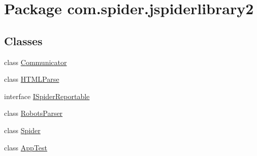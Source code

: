 \hypertarget{namespacecom_1_1spider_1_1jspiderlibrary2}{\section{\-Package com.\-spider.\-jspiderlibrary2}
\label{namespacecom_1_1spider_1_1jspiderlibrary2}
}
\subsection*{\-Classes}
\begin{DoxyCompactItemize}
\item 
class \hyperlink{classcom_1_1spider_1_1jspiderlibrary2_1_1_communicator}{\-Communicator}
\item 
class \hyperlink{classcom_1_1spider_1_1jspiderlibrary2_1_1_h_t_m_l_parse}{\-H\-T\-M\-L\-Parse}
\item 
interface \hyperlink{interfacecom_1_1spider_1_1jspiderlibrary2_1_1_i_spider_reportable}{\-I\-Spider\-Reportable}
\item 
class \hyperlink{classcom_1_1spider_1_1jspiderlibrary2_1_1_robots_parser}{\-Robots\-Parser}
\item 
class \hyperlink{classcom_1_1spider_1_1jspiderlibrary2_1_1_spider}{\-Spider}
\item 
class \hyperlink{classcom_1_1spider_1_1jspiderlibrary2_1_1_app_test}{\-App\-Test}
\end{DoxyCompactItemize}
